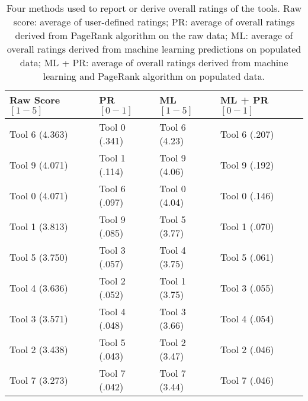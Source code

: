 \begin{table}
\centering
\setlength\extrarowheight{3pt}
\begin{tabular}{m{2.95cm} m{2.75cm} m{2.75cm} m{2.75cm}}
\toprule
\textbf{Raw Score} $[1-5]$ & \textbf{PR} $[0-1]$ & \textbf{ML} $[1-5]$ & \textbf{ML + PR} $[0-1]$\\
\hline
Tool 6 (4.363)  & Tool 0 (.341) & Tool 6 (4.23)  & Tool 6 (.207) \\ 
Tool 9 (4.071) & Tool 1 (.114)    & Tool 9 (4.06) & Tool 9 (.192) \\ 
Tool 0 (4.071)  & Tool 6 (.097)  & Tool 0 (4.04) & Tool 0 (.146)  \\ 
Tool 1 (3.813) & Tool 9 (.085) & Tool 5 (3.77)   & Tool 1 (.070)  \\ 
Tool 5 (3.750) & Tool 3 (.057)  & Tool 4 (3.75)  & Tool 5 (.061)   \\ 
Tool 4 (3.636)  & Tool 2 (.052) & Tool 1 (3.75)  & Tool 3 (.055)  \\ 
Tool 3 (3.571)  & Tool 4 (.048)  & Tool 3 (3.66) & Tool 4 (.054)  \\ 
Tool 2 (3.438)  & Tool 5 (.043)  & Tool 2 (3.47) & Tool 2 (.046)  \\
Tool 7 (3.273)  & Tool 7 (.042) & Tool 7 (3.44) & Tool 7 (.046)  \\ 
\bottomrule
\end{tabular}
\captionsetup{font = scriptsize}
\caption{Four methods used to report or derive overall ratings of the tools. Raw score: average of user-defined ratings; PR: average of overall ratings derived from PageRank algorithm on the raw data; ML: average of overall ratings derived from machine learning predictions on populated data; ML + PR: average of overall ratings derived from machine learning and PageRank algorithm on populated data.}
\label{tab:Overall Scores}
\end{table}


